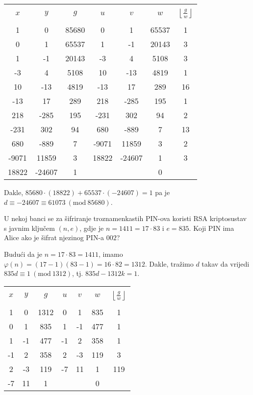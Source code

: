 \documentclass{exam}
\newcommand{\Mod}[1]{\ (\mathrm{mod}\ #1)}
\begin{document}
\begin{questions}
\begin{solution}
  \begin{tabular}{|c|c|c|c|c|c|c|}
    \hline
    & & & & & &\\[-1em]
    $x$ & $y$ & $g$ & $u$ & $v$ & $w$ & $\left\lfloor \frac{g}{w} \right\rfloor$\\
    & & & & & &\\[-1em]
    \hline
    1 & 0 & 85680 & 0 & 1 & 65537 & 1\\
    0 & 1 & 65537 & 1 & -1 & 20143 & 3\\
    1 & -1 & 20143 & -3 & 4 & 5108 & 3\\
    -3 & 4 & 5108 & 10 & -13 & 4819 & 1\\
    10 & -13 & 4819 & -13 & 17 & 289 & 16\\
    -13 & 17 & 289 & 218 & -285 & 195 & 1\\
    218 & -285 & 195 & -231 & 302 & 94 & 2\\
    -231 & 302 & 94 & 680 & -889 & 7 & 13\\
    680 & -889 & 7 & -9071 & 11859 & 3 & 2\\
    -9071 & 11859 & 3 & 18822 & -24607 & 1 & 3\\
    18822 & -24607 & 1 & & & 0 &\\
    \hline
  \end{tabular}

  Dakle, $85680 \cdot (18822) + 65537 \cdot (-24607) = 1$ pa je $d \equiv -24607 \equiv 61073 \Mod{85680}$.
\end{solution}

\pagebreak

\question U nekoj banci se za šifriranje troznamenkastih PIN-ova koristi RSA kriptosustav s javnim ključem $(n, e)$, gdje je $n = 1411 = 17 \cdot 83$ i $e = 835$. Koji PIN ima Alice ako je šifrat njezinog PIN-a $002$?

\begin{solution}
  Budući da je $n = 17 \cdot 83 = 1411$, imamo $\varphi(n) = (17 - 1)(83 - 1) = 16 \cdot 82 = 1312$. Dakle, tražimo $d$ takav da vrijedi $835d \equiv 1 \Mod{1312}$, tj. $835d - 1312k = 1$.

  \begin{tabular}{|c|c|c|c|c|c|c|}
    \hline
    & & & & & &\\[-1em]
    $x$ & $y$ & $g$ & $u$ & $v$ & $w$ & $\left\lfloor \frac{g}{w} \right\rfloor$\\
    & & & & & &\\[-1em]
    \hline
    1 & 0 & 1312 & 0 & 1 & 835 & 1\\
    0 & 1 & 835 & 1 & -1 & 477 & 1\\
    1 & -1 & 477 & -1 & 2 & 358 & 1\\
    -1 & 2 & 358 & 2 & -3 & 119 & 3\\
    2 & -3 & 119 & -7 & 11 & 1 & 119\\
    -7 & 11 & 1 & & & 0 &\\
    \hline
  \end{tabular}


\end{solution}
\end{questions}
\end{document}
